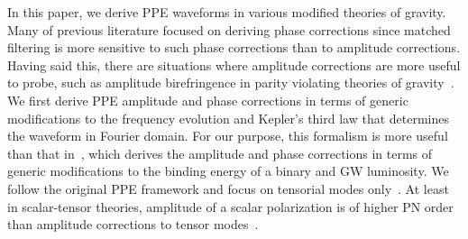 \documentclass[prd,twocolumn,nofootinbib]{revtex4-1}
\begin{document}
In this paper, we derive PPE waveforms in various modified theories of gravity. Many of previous literature focused on deriving phase corrections since matched filtering is more sensitive to such phase corrections than to amplitude corrections. Having said this, there are situations where amplitude corrections are more useful to probe, such as amplitude birefringence in parity violating theories of gravity~\cite{Alexander:2007kv,Yunes:2008bu,Yunes:2010yf,Yagi:2017zhb}. We first derive PPE amplitude and phase corrections in terms of generic modifications to the frequency evolution and Kepler's third law that determines the waveform in Fourier domain. For our purpose, this formalism is more useful than that in~\cite{Chatziioannou:2012rf}, which derives the amplitude and phase corrections in terms of generic modifications to the binding energy of a binary and GW luminosity. 
We follow the original PPE framework and focus on tensorial modes only~\cite{Yunes:2009ke,Cornish:2011ys}. 
At least in scalar-tensor theories, amplitude of a scalar polarization is of higher PN order than amplitude corrections to tensor modes~\cite{Chatziioannou:2012rf,Arun:2012hf}.



\end{document}
